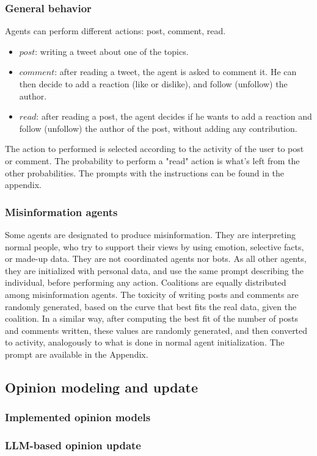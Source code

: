 \subsubsection{General behavior}
Agents can perform different actions: post, comment, read.
\begin{itemize}
    \item $post$: writing a tweet about one of the topics.
    \item $comment$: after reading a tweet, the agent is asked to comment it. He can then decide to add a reaction (like or dislike), and follow (unfollow) the author.
    \item $read$: after reading a post, the agent decides if he wants to add a reaction and follow (unfollow) the author of the post, without adding any contribution.
\end{itemize}

The action to performed is selected according to the activity of the user to post or comment. The probability to perform a "read" action is what's left from the other probabilities.
The prompts with the instructions can be found in the appendix.

\subsubsection{Misinformation agents}
Some agents are designated to produce misinformation. They are interpreting normal people, who try to support their views by using emotion, selective facts, or made-up data. They are not coordinated agents nor bots.
As all other agents, they are initialized with personal data, and use the same prompt describing the individual, before performing any action.
Coalitions are equally distributed among misinformation agents.
The toxicity of writing posts and comments are randomly generated, based on the curve that best fits the real data, given the coalition.
In a similar way, after computing the best fit of the number of posts and comments written, these values are randomly generated, and then converted to activity, analogously to what is done in normal agent initialization.
The prompt are available in the Appendix.

\subsection{Opinion modeling and update}
\subsubsection{Implemented opinion models}

\subsubsection{LLM-based opinion update}
